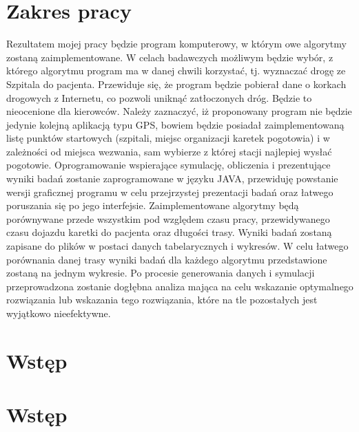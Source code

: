 \documentclass[12pt]{article} %
\begin{document}
\section{Zakres pracy}
Rezultatem mojej pracy będzie program komputerowy, w którym owe algorytmy zostaną zaimplementowane. W celach badawczych możliwym będzie wybór, z którego algorytmu program ma w danej chwili korzystać, tj. wyznaczać drogę ze Szpitala do pacjenta. Przewiduje się, że program będzie pobierał dane o korkach drogowych z Internetu, co pozwoli uniknąć zatłoczonych dróg. Będzie to nieocenione dla kierowców. Należy zaznaczyć, iż proponowany program nie będzie jedynie kolejną aplikacją typu GPS, bowiem będzie posiadał zaimplementowaną listę punktów startowych (szpitali, miejsc organizacji karetek pogotowia) i w zależności od miejsca wezwania, sam wybierze z której stacji najlepiej wysłać pogotowie.
Oprogramowanie wspierające symulację, obliczenia i prezentujące wyniki badań zostanie zaprogramowane w języku JAVA, przewiduję powstanie wersji graficznej programu w celu przejrzystej prezentacji badań oraz łatwego poruszania się po jego interfejsie.
Zaimplementowane algorytmy będą porównywane przede wszystkim pod względem czasu pracy, przewidywanego czasu dojazdu karetki do pacjenta oraz długości trasy. Wyniki badań zostaną zapisane do plików w postaci danych tabelarycznych i wykresów. W celu łatwego porównania danej trasy wyniki badań dla każdego algorytmu przedstawione zostaną na jednym wykresie.
Po procesie generowania danych i symulacji przeprowadzona zostanie dogłębna analiza mająca na celu wskazanie optymalnego rozwiązania lub wskazania tego rozwiązania, które na tle pozostałych jest wyjątkowo nieefektywne.
\section{Wstęp}
\section{Wstęp}



\newpage
\end{document}
